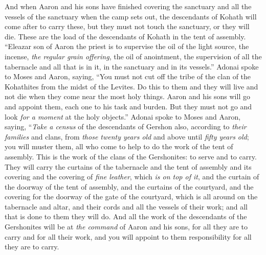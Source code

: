 \begin{biblechapter}
\verse And when Aaron and his sons have finished covering the sanctuary and all the vessels of the sanctuary when the camp sets out, the descendants of Kohath will come after to carry these, but they must not touch the sanctuary, or they will die. These are the load of the descendants of Kohath in the tent of assembly.
\verse “Eleazar son of Aaron the priest is to supervise the oil of the light source, the incense, \textit{the regular grain offering}, the oil of anointment, the supervision of all the tabernacle and all that is in it, in the sanctuary and in its vessels.”
\verse Adonai spoke to Moses and Aaron, saying,
\verse “You must not cut off the tribe of the clan of the Kohathites from the midst of the Levites.
\verse Do this to them and they will live and not die when they come near the most holy things. Aaron and his sons will go and appoint them, each one to his task and burden.
\verse But they must not go and look \textit{for a moment} at the holy objects.”
\verse Adonai spoke to Moses and Aaron, saying,
\verse “\textit{Take a census} of the descendants of Gershon also, according to \textit{their families} and clans,
\verse from \textit{those twenty years old} and above until \textit{fifty years old}; you will muster them, all who come to help to do the work of the tent of assembly.
\verse This is the work of the clans of the Gershonites: to serve and to carry.
\verse They will carry the curtains of the tabernacle and the tent of assembly and its covering and the covering of \textit{fine leather}, which \textit{is on top of it}, and the curtain of the doorway of the tent of assembly,
\verse and the curtains of the courtyard, and the covering for the doorway of the gate of the courtyard, which is all around on the tabernacle and altar, and their cords and all the vessels of their work; and all that is done to them they will do.
\verse And all the work of the descendants of the Gershonites will be at \textit{the command} of Aaron and his sons, for all they are to carry and for all their work, and you will appoint to them responsibility for all they are to carry.

\end{biblechapter}
